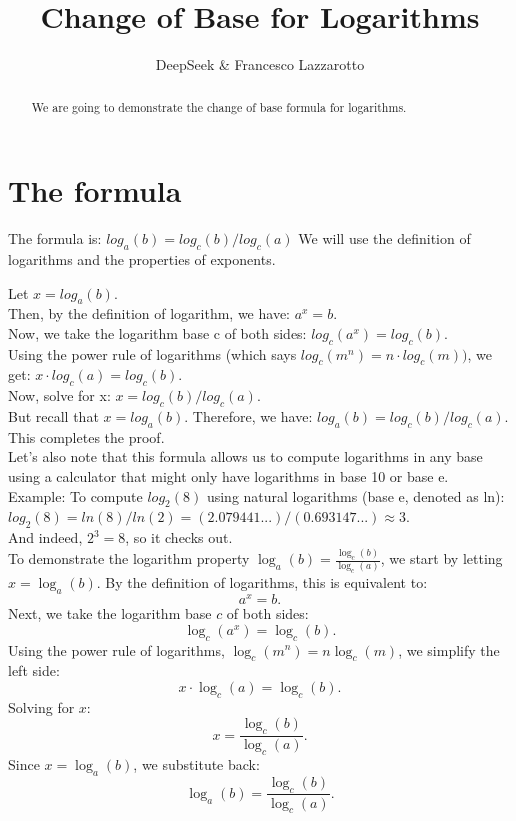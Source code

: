 \documentclass[a4paper,10pt]{article}
\title{Change of Base for Logarithms}
\author{DeepSeek \& Francesco Lazzarotto}
\begin{document}
\maketitle

\begin{abstract}
We are going to demonstrate the change of base formula for logarithms.
\end{abstract}

\section{The formula}

The formula is: \(log_a(b) = log_c(b) / log_c(a)\)
 We will use the definition of logarithms and the properties of exponents.

Let \( x = log_a(b) \). \\
Then, by the definition of logarithm, we have:
\(   a^x = b \).\\

Now, we take the logarithm base c of both sides:
\(   log_c(a^x) = log_c(b).\)\\

Using the power rule of logarithms (which says \(log_c(m^n) = n \cdot log_c(m))\), we get:
\(   x \cdot log_c(a) = log_c(b).\)\\

Now, solve for x:
\(   x = log_c(b) / log_c(a). \)\\

But recall that \(x = log_a(b)\). Therefore, we have:
\(   log_a(b) = log_c(b) / log_c(a). \)\\
This completes the proof.\\
Let's also note that this formula allows us to compute logarithms in any base using a calculator that might only have logarithms in base 10 or base e.\\
Example: To compute \(log_2(8)\) using natural logarithms (base e, denoted as ln):
  \( log_2(8) = ln(8) / ln(2) = (2.079441...) / (0.693147...) \approx 3.\)\\
And indeed, \(2^3 = 8\), so it checks out.\\
To demonstrate the logarithm property \(\log_a(b) = \frac{\log_c(b)}{\log_c(a)}\), we start by letting \(x = \log_a(b)\). By the definition of logarithms, this is equivalent to:
\[
a^x = b.
\]
Next, we take the logarithm base \(c\) of both sides:
\[
\log_c(a^x) = \log_c(b).
\]
Using the power rule of logarithms, \(\log_c(m^n) = n \log_c(m)\), we simplify the left side:
\[
x \cdot \log_c(a) = \log_c(b).
\]
Solving for \(x\):
\[
x = \frac{\log_c(b)}{\log_c(a)}.
\]
Since \(x = \log_a(b)\), we substitute back:
\[
\log_a(b) = \frac{\log_c(b)}{\log_c(a)}.
\]
\end{document}
